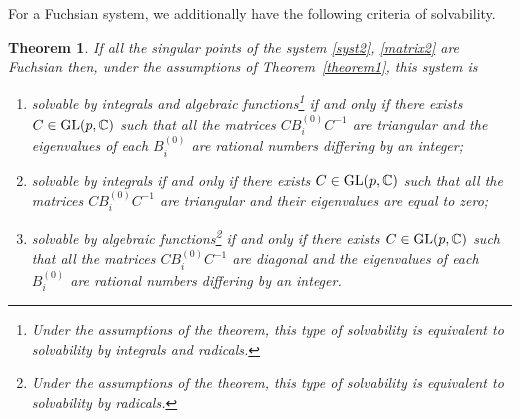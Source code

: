 \documentclass[pdftex]{sigma}
\numberwithin{equation}{section}
\newtheorem{Theorem}{Theorem}[section]
\begin{document}
For a Fuchsian system, we additionally have the following criteria of solvability.

\begin{Theorem}\label{theorem3}
If all the singular points of the system \eqref{syst2}, \eqref{matrix2} are Fuchsian then, under the assumptions of Theorem~{\rm \ref{theorem1}}, this system is
\begin{enumerate}\itemsep=0pt
	\item[$1)$] solvable by integrals and algebraic functions\footnote{Under the assumptions of the theorem, this type of solvability is equivalent to solvability by integrals and radicals.} if and only if there exists
	$C\in{\rm GL}(p,\mathbb C)$ such that all the matrices $CB^{(0)}_iC^{-1}$ are triangular and the eigenvalues of each $B^{(0)}_i$ are rational numbers differing by an integer;
	\item[$2)$] solvable by integrals if and only if there exists $C\in{\rm GL}(p,\mathbb C)$ such that all the matrices $CB^{(0)}_iC^{-1}$ are triangular and their eigenvalues are equal to zero;
	\item[$3)$] solvable by algebraic functions\footnote{Under the assumptions of the theorem, this type of solvability is equivalent to solvability by radicals.} if and only if there exists $C\in{\rm GL}(p,\mathbb C)$ such that all the matrices $CB^{(0)}_iC^{-1}$ are diagonal and the eigenvalues of each $B^{(0)}_i$ are rational numbers differing by an integer.
\end{enumerate}
\end{Theorem}
\end{document}
